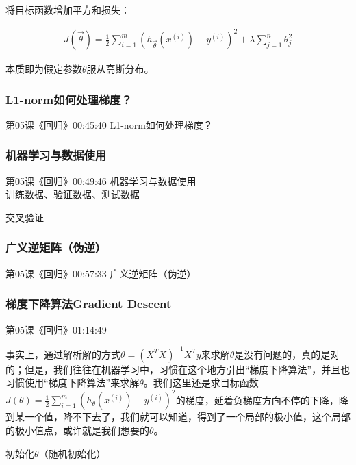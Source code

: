 \documentclass[UTF8]{ctexbook}
\begin{document}
将目标函数增加平方和损失：

\begin{equation}
\begin{aligned}
J(\vec{\theta})=\frac{1}{2}\sum_{i=1}^{m} \left ( h_{\vec{\theta}}(x^{(i)}) - y^{(i)} \right )^{2}
+ \lambda \sum_{j=1}^{n} \theta_{j}^{2}
\end{aligned}
\end{equation}

本质即为假定参数$\theta$服从高斯分布。

\subsubsection{L1-norm如何处理梯度？}

第05课《回归》00:45:40 L1-norm如何处理梯度？\\

\subsubsection{机器学习与数据使用}

第05课《回归》00:49:46 机器学习与数据使用\\

训练数据、验证数据、测试数据

交叉验证

\subsubsection{广义逆矩阵（伪逆）}

第05课《回归》00:57:33 广义逆矩阵（伪逆）\\

\subsubsection{梯度下降算法Gradient Descent}

第05课《回归》01:14:49

事实上，通过解析解的方式$\theta = (X^{T}X)^{-1} X^{T}y$来求解$\theta$是没有问题的，真的是对的；但是，我们往往在机器学习中，习惯在这个地方引出“梯度下降算法”，并且也习惯使用“梯度下降算法”来求解$\theta$。我们这里还是求目标函数$J(\theta)=\frac{1}{2} \sum_{i=1}^{m}(h_{\theta}(x^{(i)}) - y^{(i)})^{2}$的梯度，延着负梯度方向不停的下降，降到某一个值，降不下去了，我们就可以知道，得到了一个局部的极小值，这个局部的极小值点，或许就是我们想要的$\theta$。

初始化$\theta$（随机初始化）
\end{document}
